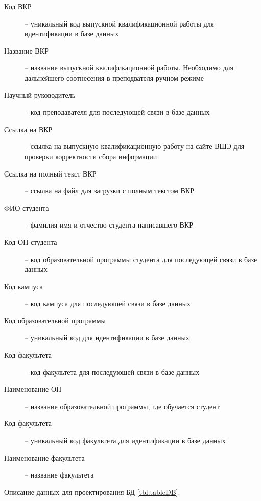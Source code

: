 \documentclass[PI,KR]{HSEUniversity}
\begin{document}
\begin{description}
	\item [Код ВКР]  -- уникальный код выпускной квалификационной работы для идентификации в базе данных
	\item [Название ВКР] -- название выпускной квалификационной работы. Необходимо для дальнейшего соотнесения в преподвателя ручном режиме
	\item [Научный руководитель] -- код преподавателя для последующей связи в базе данных
	\item [Ссылка на ВКР] -- ссылка на выпускную квалификационную работу на сайте ВШЭ для проверки корректности сбора информации
	\item [Ссылка на полный текст ВКР] -- ссылка на файл для загрузки с полным текстом ВКР
	\item [ФИО студента] -- фамилия имя и отчество студента написавшего ВКР
	\item [Код ОП студента] -- код образовательной программы студента для последующей связи в базе данных
	\item [Код кампуса] -- код кампуса для последующей связи в базе данных
	
	\item [Код образовательной программы] -- уникальный код для идентификации в базе данных
	\item [Код факультета] -- код факультета для последующей связи в базе данных
	\item [Наименование ОП] -- название образовательной программы, где обучается студент
	
	\item [Код факультета] -- уникальный код факультета для идентификации в базе данных
	\item [Наименование факультета] -- название факультета
\end{description} 
Описание данных для проектирования БД \ref{tbl:tableDB}.
\end{document}
